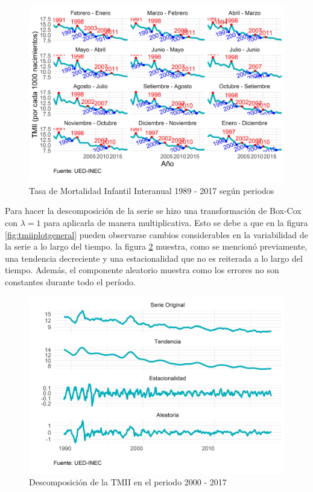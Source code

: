 \documentclass[
]{article}
\begin{document}
\begin{figure}[!h]
\includegraphics[width=1\linewidth,height=1\textheight]{Tesis_files/figure-latex/tmiiplotperiodos-1} \caption{Tasa de Mortalidad Infantil Interanual 1989 - 2017 según periodos}\label{fig:tmiiplotperiodos}
\end{figure}

Para hacer la descomposición de la serie se hizo una transformación de
Box-Cox con \(\lambda=1\) para aplicarla de manera multiplicativa. Esto
se debe a que en la figura \ref{fig:tmiiplotgeneral} pueden observarse
cambios considerables en la variabilidad de la serie a lo largo del
tiempo. la figura \ref{fig:tmiiplotdescomposicion} muestra, como se
mencionó previamente, una tendencia decreciente y una estacionalidad que
no es reiterada a lo largo del tiempo. Además, el componente aleatorio
muestra como los errores no son constantes durante todo el período.

\begin{figure}[!h]
\includegraphics[width=1\linewidth,height=1\textheight]{Tesis_files/figure-latex/tmiiplotdescomposicion-1} \caption{Descomposición de la TMII en el periodo 2000 - 2017}\label{fig:tmiiplotdescomposicion}
\end{figure}
\end{document}

